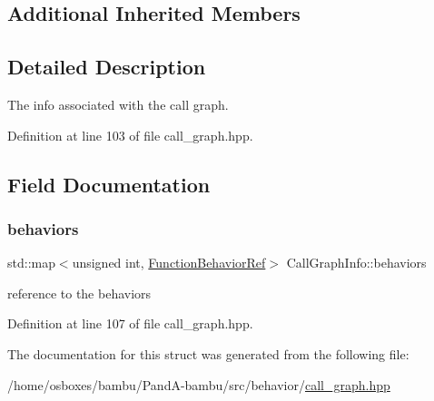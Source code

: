 \subsection*{Additional Inherited Members}


\subsection{Detailed Description}
The info associated with the call graph. 

Definition at line 103 of file call\+\_\+graph.\+hpp.



\subsection{Field Documentation}
\mbox{\label{structCallGraphInfo_abcc4ddc6fb1603a1d2bd37fc4029cdc3}} 
\subsubsection{\texorpdfstring{behaviors}{behaviors}}
{\footnotesize\ttfamily std\+::map$<$unsigned int, \hyperlink{function__behavior_8hpp_affbc6a46ab86ddfabe31c10986d333dc}{Function\+Behavior\+Ref}$>$ Call\+Graph\+Info\+::behaviors}



reference to the behaviors 



Definition at line 107 of file call\+\_\+graph.\+hpp.



The documentation for this struct was generated from the following file\+:\begin{DoxyCompactItemize}
\item 
/home/osboxes/bambu/\+Pand\+A-\/bambu/src/behavior/\hyperlink{call__graph_8hpp}{call\+\_\+graph.\+hpp}\end{DoxyCompactItemize}
